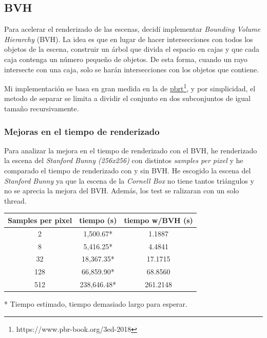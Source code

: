 \documentclass{article}
\begin{document}
\subsection{BVH}
Para acelerar el renderizado de las escenas, decidí implementar \textit{Bounding
  Volume Hierarchy} (BVH). La idea es que en lugar de hacer intersecciones con
todos los objetos de la escena, construir un árbol que divida el espacio en
cajas y que cada caja contenga un número pequeño de objetos. De esta forma,
cuando un rayo intersecte con una caja, solo se harán intersecciones con los
objetos que contiene.

Mi implementación se basa en gran medida en la de
\href{https://www.pbr-book.org/3ed-2018/Primitives_and_Intersection_Acceleration/Bounding_Volume_Hierarchies}{pbrt}\footnote{https://www.pbr-book.org/3ed-2018},
y por simplicidad, el metodo de separar se limita a dividir el conjunto en dos
subconjuntos de igual tamaño recursivamente.

\subsubsection{Mejoras en el tiempo de renderizado}

Para analizar la mejora en el tiempo de renderizado con el BVH, he renderizado
la escena del \textit{Stanford Bunny (256x256)} con distintos \textit{samples
  per pixel} y he comparado el tiempo de renderizado con y sin BVH. He escogido
la escena del \textit{Stanford Bunny} ya que la escena de la \textit{Cornell
  Box} no tiene tantos triángulos y no se aprecia la mejora del BVH. Además, los
test se ralizaran con un solo thread.

\begin{center}
\begin{tabular}{||c c c||}
 \hline
 Samples per pixel & tiempo (s) & tiempo w/BVH (s) \\ [0.5ex]
 \hline\hline
 2 & 1,500.67* & 1.1887 \\
 \hline
 8 & 5,416.25* & 4.4841 \\
 \hline
 32 & 18,367.35* & 17.1715 \\
 \hline
 128 & 66,859.90* & 68.8560 \\
 \hline
 512 & 238,646.48* & 261.2148 \\ [1ex]
 \hline
\end{tabular}
\end{center}

* Tiempo estimado, tiempo demasiado largo para esperar.
\end{document}
